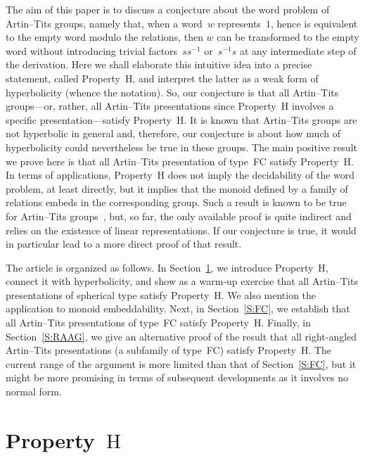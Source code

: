 \documentclass{amsart}
\numberwithin{equation}{section}
\theoremstyle{plain}
\theoremstyle{definition}
\begin{document}
The aim of this paper is to discuss a conjecture about the word problem of Artin--Tits groups, namely that, when a word~${w}$ represents~$1$, hence is equivalent to the empty word modulo the relations, then ${w}$ can be transformed to the empty word without introducing trivial factors~${s} {s}{^{-1}}$ or~${s}{^{-1}} {s}$ at any intermediate step of the derivation. Here we shall elaborate this intuitive idea into a precise statement, called Property~${\mathrm{H}}$, and interpret the latter as a weak form of hyperbolicity (whence the notation). So, our conjecture is that all Artin--Tits groups---or, rather, all Artin--Tits presentations since Property~${\mathrm{H}}$ involves a specific presentation---satisfy Property~${\mathrm{H}}$. It is known that Artin--Tits groups are not hyperbolic in general and, therefore, our conjecture is about how much of hyperbolicity could nevertheless be true in these groups. The main positive result we prove here is that all Artin--Tits presentation of type~FC satisfy Property~${\mathrm{H}}$. In terms of applications, Property~${\mathrm{H}}$ does not imply the decidability of the word problem, at least directly, but it implies that the monoid defined by a family of relations embeds in the corresponding group. Such a result is known to be true for Artin--Tits groups~\cite{Par}, but, so far, the only available proof is quite indirect and relies on the existence of linear representations. If our conjecture is true, it would in particular lead to a more direct proof of that result.

The article is organized as follows. In Section~\ref{S:Prop}, we introduce Property~${\mathrm{H}}$, connect it with hyperbolicity, and show as a warm-up exercise that all Artin--Tits presentations of spherical type satisfy Property~${\mathrm{H}}$. We also mention the application to monoid embeddability. Next, in Section~\ref{S:FC}, we establish that all Artin--Tits presentations of type~FC satisfy Property~${\mathrm{H}}$. Finally, in Section~\ref{S:RAAG}, we give an alternative proof of the result that all right-angled Artin--Tits presentations (a subfamily of type~FC) satisfy Property~${\mathrm{H}}$. The current range of the argument is more limited than that of Section~\ref{S:FC}, but it might be more promising in terms of subsequent developments as it involves no normal form. 

\section{Property~${\mathrm{H}}$}
\label{S:Prop}
\end{document}
